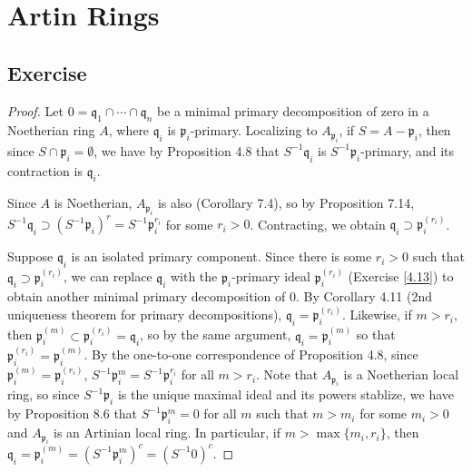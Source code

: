 \section{Artin Rings}

\subsection{Exercise}\label{8.1}

\begin{proof}
Let $0 = \mathfrak{q}_1 \cap \cdots \cap \mathfrak{q}_n$ be a minimal primary decomposition of zero in a Noetherian ring $A$,
where $\mathfrak{q}_i$ is $\mathfrak{p}_i$-primary. Localizing to $A_{\mathfrak{p}_i}$, if $S = A - \mathfrak{p}_i$, then since
$S \cap \mathfrak{p}_i = \emptyset$, we have by Proposition 4.8 that $S^{-1}\mathfrak{q}_i$ is $S^{-1}\mathfrak{p}_i$-primary,
and its contraction is $\mathfrak{q}_i$.

Since $A$ is Noetherian, $A_{\mathfrak{p}_i}$ is also (Corollary 7.4), so by Proposition 7.14, 
$S^{-1}\mathfrak{q}_i \supset (S^{-1}\mathfrak{p}_i)^r = S^{-1}\mathfrak{p}_i^{r_i}$ for some $r_i > 0$. Contracting, we obtain
$\mathfrak{q}_i \supset \mathfrak{p}_i^{(r_i)}$.

Suppose $\mathfrak{q}_i$ is an isolated primary component. Since there is some $r_i > 0$ such that $\mathfrak{q}_i \supset \mathfrak{p}_i^{(r_i)}$, 
we can replace $\mathfrak{q}_i$ with the $\mathfrak{p}_i$-primary ideal $\mathfrak{p}_i^{(r_i)}$ (Exercise \ref{4.13}) to obtain another minimal
primary decomposition of $0$. By Corollary 4.11 (2nd uniqueness theorem for primary decompositions), $\mathfrak{q}_i = \mathfrak{p}_i^{(r_i)}$. Likewise,
if $m > r_i$, then $\mathfrak{p}_i^{(m)} \subset \mathfrak{p}_i^{(r_i)} = \mathfrak{q}_i$, so by the same argument, $\mathfrak{q}_i = \mathfrak{p}_i^{(m)}$
so that $\mathfrak{p}_i^{(r_i)} = \mathfrak{p}_i^{(m)}$. By the one-to-one correspondence of Proposition 4.8, since $\mathfrak{p}_i^{(m)} = \mathfrak{p}_i^{(r_i)}$,
$S^{-1}\mathfrak{p}_i^m = S^{-1}\mathfrak{p}_i^{r_i}$ for all $m > r_i$. Note that $A_{\mathfrak{p}_i}$ is a Noetherian local ring, so since
$S^{-1}\mathfrak{p}_i$ is the unique maximal ideal and its powers stablize, we have by Proposition 8.6 that $S^{-1}\mathfrak{p}_i^m = 0$ for
all $m$ such that $m > m_i$ for some $m_i > 0$ and $A_{\mathfrak{p}_i}$ is an Artinian local ring. In particular, if $m > \max\{m_i,r_i\}$, then
$\mathfrak{q}_i = \mathfrak{p}_i^{(m)} = (S^{-1}\mathfrak{p}_i^m)^c = (S^{-1}0)^c$.


\end{proof}
